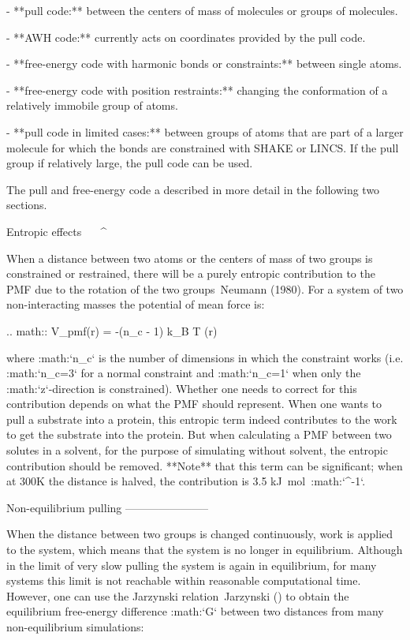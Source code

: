 -  **pull code:** between the centers of mass of molecules or groups of
   molecules.

-  **AWH code:** currently acts on coordinates provided by the pull
   code.

-  **free-energy code with harmonic bonds or constraints:** between
   single atoms.

-  **free-energy code with position restraints:** changing the
   conformation of a relatively immobile group of atoms.

-  **pull code in limited cases:** between groups of atoms that are part
   of a larger molecule for which the bonds are constrained with SHAKE
   or LINCS. If the pull group if relatively large, the pull code can be
   used.

The pull and free-energy code a described in more detail in the
following two sections.

Entropic effects
^^^^^^^^^^^^^^^^

When a distance between two atoms or the centers of mass of two groups
is constrained or restrained, there will be a purely entropic
contribution to the PMF due to the rotation of the two groups Neumann
(1980). For a system of two non-interacting masses the potential of mean
force is:

.. math:: V_{pmf}(r) = -(n_c - 1) k_B T \log(r)

where :math:`n_c` is the number of dimensions in which the constraint
works (i.e. :math:`n_c=3` for a normal constraint and :math:`n_c=1` when
only the :math:`z`-direction is constrained). Whether one needs to
correct for this contribution depends on what the PMF should represent.
When one wants to pull a substrate into a protein, this entropic term
indeed contributes to the work to get the substrate into the protein.
But when calculating a PMF between two solutes in a solvent, for the
purpose of simulating without solvent, the entropic contribution should
be removed. **Note** that this term can be significant; when at 300K the
distance is halved, the contribution is 3.5 kJ mol\ :math:`^{-1}`.

Non-equilibrium pulling
-----------------------

When the distance between two groups is changed continuously, work is
applied to the system, which means that the system is no longer in
equilibrium. Although in the limit of very slow pulling the system is
again in equilibrium, for many systems this limit is not reachable
within reasonable computational time. However, one can use the Jarzynski
relation Jarzynski () to obtain the equilibrium free-energy difference
:math:`\Delta G` between two distances from many non-equilibrium
simulations:

